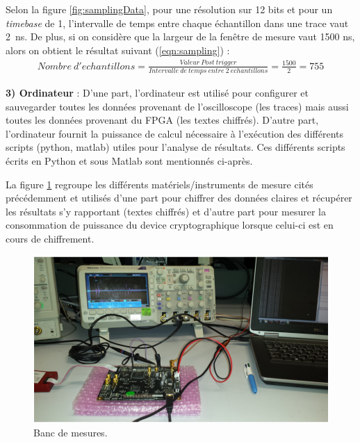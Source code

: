 \documentclass[oneside]{book}
\begin{document}
\hspace{-0.5cm}Selon la figure \ref{fig:samplingData}, pour une résolution sur 12 bits et pour un \textit{timebase} de 1, l'intervalle de temps entre chaque échantillon dans une trace vaut \SI{2}{\nano\second}. De plus, si on considère que la largeur de la fenêtre de mesure vaut 1500 ns, alors on obtient le résultat suivant (\ref{eqn:sampling}) : 
\begin{gather}
	 Nombre \ d'echantillons = \frac{Valeur \ Post \ trigger}{Intervalle \ de \ temps \ entre \ 2 \ echantillons} = \frac{1500}{2} = 755 \label{eqn:sampling}
\end{gather}

\hspace{-0.5cm}\textbf{3) Ordinateur} : D'une part, l'ordinateur est utilisé pour configurer et sauvegarder toutes les données provenant de l'oscilloscope (les traces) mais aussi toutes les données provenant du FPGA (les textes chiffrés). D'autre part, l'ordinateur fournit la puissance de calcul nécessaire à l'exécution des différents scripts (python, matlab) utiles pour l'analyse de résultats. Ces différents scripts écrits en Python et sous Matlab sont mentionnés ci-après.

\newpage

\hspace{-0.5cm}La figure \ref{fig:matos} regroupe les différents matériels/instruments de mesure cités précédemment et utilisés d'une part pour chiffrer des données claires et récupérer les résultats s'y rapportant (textes chiffrés) et d'autre part pour mesurer la consommation de puissance du device cryptographique lorsque celui-ci est en cours de chiffrement.
\begin{figure}[htbp]
    \centering
    \includegraphics[scale=0.35]{image/matos}
    \caption{Banc de mesures.}
    \label{fig:matos} 
\end{figure}
\end{document}
